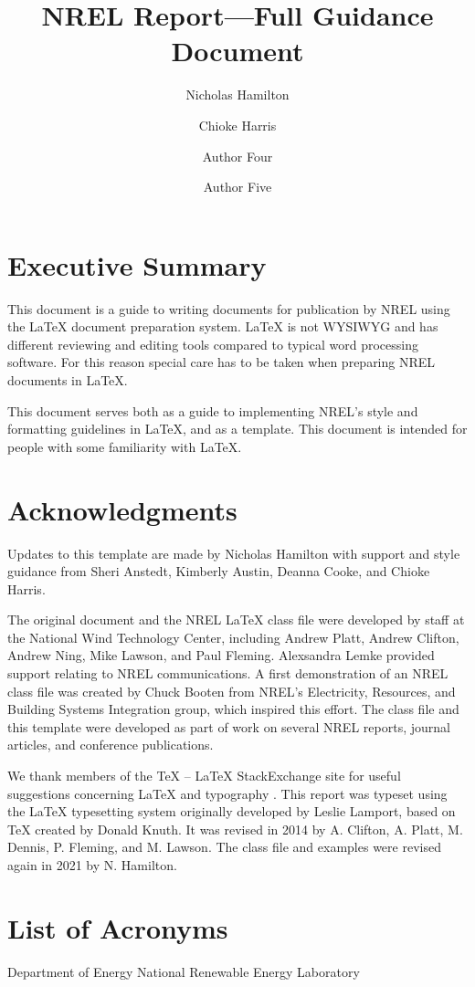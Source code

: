 \documentclass[]{nrel}
\title{NREL Report---Full Guidance Document}
\author{Nicholas Hamilton}
\author{Chioke Harris}
\affil{National Renewable Energy Laboratory}
\author{Author Four}
\affil{Another affiliation}
\author{Author Five}
\affil{A third affiliation}
\begin{document}
\frontmatter
\chapter{Executive Summary}
This document is a guide to writing documents for publication by NREL using the LaTeX document preparation system. LaTeX is not WYSIWYG and has different reviewing and editing tools compared to typical word processing software. For this reason special care has to be taken when preparing NREL documents in LaTeX.


This document serves both as a guide to implementing NREL's style and formatting guidelines in LaTeX, and as a template. This document is intended for people with some familiarity with LaTeX.

\chapter{Acknowledgments}
Updates to this template are made by Nicholas Hamilton with support and style guidance from  Sheri Anstedt, Kimberly Austin, Deanna Cooke, and Chioke Harris.

The original document and the NREL LaTeX class file were developed by staff at the National Wind Technology Center, including Andrew Platt, Andrew Clifton, Andrew Ning, Mike Lawson, and Paul Fleming. Alexsandra Lemke provided support relating to NREL communications. A first demonstration of an NREL class file was created by Chuck Booten from NREL's Electricity, Resources, and Building Systems Integration group, which inspired this effort. The class file and this template were developed as part of work on several NREL reports, journal articles, and conference publications.

We thank members of the TeX -- LaTeX StackExchange site for useful suggestions concerning LaTeX and typography \citep{texstackexchange}.
This report was typeset using the LaTeX typesetting system originally developed by Leslie Lamport, based on TeX created by Donald Knuth. It was revised in 2014 by A. Clifton, A. Platt, M. Dennis, P. Fleming, and M. Lawson. The class file and examples were revised again in 2021 by N. Hamilton.

\chapter{List of Acronyms} %
\begin{acronym}[ICANN]
      {Department of Energy}
      {National Renewable Energy Laboratory}
\end{acronym}
\end{document}
